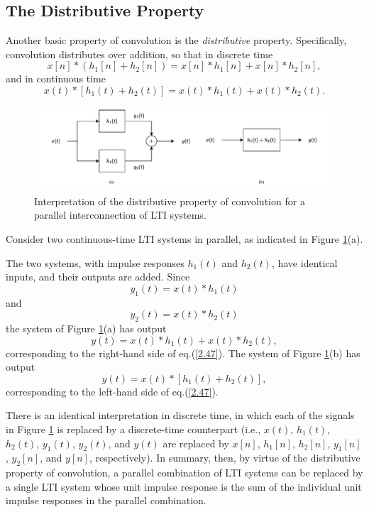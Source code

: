 \documentclass[a4paper,twoside]{book}
\begin{document}
\subsection{The Distributive Property}

Another basic property of convolution is the \textit{distributive} property. Specifically, convolution distributes over addition, so that in discrete time
\begin{equation}
    x[n]*(h_{1}[n]+h_{2}[n])= x[n]*h_{1}[n]+ x[n]*h_{2}[n],
    \label{2.46}
\end{equation}
and in continuous time
\begin{equation}
    x(t)*[h_{1}(t)+h_{2}(t)]=x(t)*h_{1}(t)+x(t)*h_{2}(t).
    \label{2.47}
\end{equation}

\begin{figure}[htbp]
    \centering
    \includegraphics[width=\linewidth]{Fig5.pdf}
    \caption{Interpretation of the distributive property of convolution for a parallel interconnection of LTI systems.}
    \label{Fig5}
\end{figure}

Consider two continuous-time LTI systems in parallel, as indicated in Figure \ref{Fig5}(a).

The two systems, with impulse responses $h_1(t)$ and $h_2(t)$, have identical inputs, and their outputs are added. Since $$y_1(t)=x(t)*h_1(t)$$ and $$y_2(t)=x(t)*h_2(t)$$ the system of Figure \ref{Fig5}(a) has output
\begin{equation}
    y(t) = x(t)*h_1(t)+x(t)*h_2(t),
    \label{2.48}
\end{equation}
corresponding to the right-hand side of eq.\;(\ref{2.47}). The system of Figure \ref{Fig5}(b) has output
\begin{equation}
    y(t) = x(t)*[h_1(t)+h_2(t)],
    \label{2.49}
\end{equation}
corresponding to the left-hand side of eq.\;(\ref{2.47}).

There is an identical interpretation in discrete time, in which each of the signals in Figure \ref{Fig5} is replaced by a discrete-time counterpart (i.e., $x(t)$, $h_1(t)$, $h_2(t)$, $y_1(t)$, $y_2(t)$, and $y(t)$ are replaced by $x[n]$, $h_1[n]$, $h_2[n]$, $y_1[n]$, $y_2[n]$, and $y[n]$, respectively). In summary, then, by virtue of the distributive property of convolution, a parallel combination of LTI systems can be replaced by a single LTI system whose unit impulse response is the sum of the individual unit impulse responses in the parallel combination.
\end{document}
